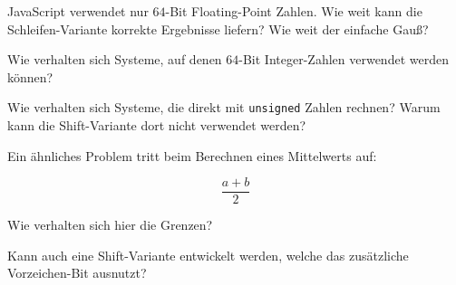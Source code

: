 \documentclass[a5paper,landscape,ngerman,10pt]{article}
\begin{document}
JavaScript verwendet nur $64$-Bit Floating-Point Zahlen.
Wie weit kann die Schleifen-Variante korrekte Ergebnisse
liefern? Wie weit der einfache Gauß?

Wie verhalten sich Systeme, auf denen $64$-Bit Integer-Zahlen
verwendet werden können?

Wie verhalten sich Systeme, die direkt mit
\lstinline!unsigned! Zahlen rechnen?
Warum kann die Shift-Variante dort nicht verwendet werden?

Ein ähnliches Problem tritt beim Berechnen eines Mittelwerts
auf:

\[\frac{a+b}2\]

Wie verhalten sich hier die Grenzen?

Kann auch eine Shift-Variante entwickelt werden, welche
das zusätzliche Vorzeichen-Bit ausnutzt?
\end{document}
